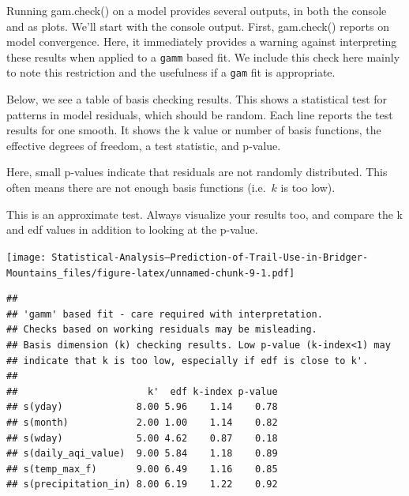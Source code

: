 \documentclass[
]{book}
\newenvironment{Shaded}{\begin{snugshade}}{\end{snugshade}}
\newcommand{\AttributeTok}[1]{\textcolor[rgb]{0.77,0.63,0.00}{#1}}
\newcommand{\CommentTok}[1]{\textcolor[rgb]{0.56,0.35,0.01}{\textit{#1}}}
\newcommand{\DecValTok}[1]{\textcolor[rgb]{0.00,0.00,0.81}{#1}}
\newcommand{\FunctionTok}[1]{\textcolor[rgb]{0.00,0.00,0.00}{#1}}
\newcommand{\NormalTok}[1]{#1}
\newcommand{\SpecialCharTok}[1]{\textcolor[rgb]{0.00,0.00,0.00}{#1}}
\begin{document}
Running gam.check() on a model provides several outputs, in both the console and as plots. We'll start with the console output. First, gam.check() reports on model convergence. Here, it immediately provides a warning against interpreting these results when applied to a \texttt{gamm} based fit. We include this check here mainly to note this restriction and the usefulness if a \texttt{gam} fit is appropriate.

Below, we see a table of basis checking results. This shows a statistical test for patterns in model residuals, which should be random. Each line reports the test results for one smooth. It shows the k value or number of basis functions, the effective degrees of freedom, a test statistic, and p-value.

Here, small p-values indicate that residuals are not randomly distributed. This often means there are not enough basis functions (i.e.~\(k\) is too low).

This is an approximate test. Always visualize your results too, and compare the k and edf values in addition to looking at the p-value.

\begin{Shaded}
\end{Shaded}

\texttt{[image: Statistical-Analysis--Prediction-of-Trail-Use-in-Bridger-Mountains\_files/figure-latex/unnamed-chunk-9-1.pdf]}

\begin{verbatim}
## 
## 'gamm' based fit - care required with interpretation.
## Checks based on working residuals may be misleading.
## Basis dimension (k) checking results. Low p-value (k-index<1) may
## indicate that k is too low, especially if edf is close to k'.
## 
##                       k'  edf k-index p-value
## s(yday)             8.00 5.96    1.14    0.78
## s(month)            2.00 1.00    1.14    0.82
## s(wday)             5.00 4.62    0.87    0.18
## s(daily_aqi_value)  9.00 5.84    1.18    0.89
## s(temp_max_f)       9.00 6.49    1.16    0.85
## s(precipitation_in) 8.00 6.19    1.22    0.92
\end{verbatim}
\end{document}

